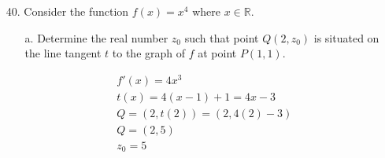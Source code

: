 \documentclass[10pt, letterpaper]{article}
\begin{document}
\begin{itemize}
        \pagebreak

        \item [40.] Consider the function $f(x) = x^4$ where $x \in \mathbb{R}$.
        
        \begin{mdframed}
            \begin{itemize}
                \item [a.]  Determine the real number $z_{0}$ such that point $Q(2, z_{0})$ is situated on the line tangent $t$ to the graph of $f$ at point $P(1,1)$.
                
                \begin{equation*}
                    \begin{gathered}
                        f'(x) = 4x^3                \\
                        t(x) = 4(x-1) + 1 = 4x - 3   \\
                        Q = (2, t(2)) 
                          = (2, 4(2) - 3)           \\
                        Q = (2, 5)                  \\
                        z_{0} = \boxed{5}
                    \end{gathered}
                \end{equation*}
                    
                \begin{center}
                \end{center}
                

\end{itemize}
\end{mdframed}
\end{itemize}
\end{document}
